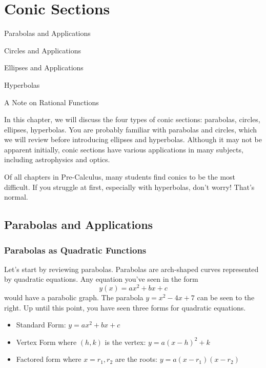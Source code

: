 \documentclass[../book.tex]{subfiles}
\begin{document}
\chapter{Conic Sections}
\begin{introduction}[Contents]
\item Parabolas and Applications
\item Circles and Applications
\item Ellipses and Applications
\item Hyperbolas
\item A Note on Rational Functions
\end{introduction}

\noindent In this chapter, we will discuss the four types of conic sections: parabolas, circles, ellipses, hyperbolas.  You are probably familiar with parabolas and circles, which we will review before introducing ellipses and hyperbolas.  Although it may not be apparent initially, conic sections have various applications in many subjects, including astrophysics and optics.  

\begin{remark} 
Of all chapters in Pre-Calculus, many students find conics to be the most difficult.  If you struggle at first, especially with hyperbolas, don't worry!  That's normal.
\end{remark}

\section{Parabolas and Applications}
\subsection{Parabolas as Quadratic Functions}
\noindent Let's start by reviewing parabolas.  Parabolas are arch-shaped curves represented by quadratic equations.  Any equation you've seen in the form $$y(x) = ax^2+bx+c$$
would have a parabolic graph.  The parabola $y=x^2-4x+7$ can be seen to the right.  Up until this point, you have seen three forms for quadratic equations.

\begin{itemize}
    \item Standard Form: $y = ax^2+bx+c$
    \item Vertex Form where $(h,k)$ is the vertex: $y = a(x-h)^2+k $
    \item Factored form where $x=r_1,r_2$ are the roots: $y = a(x-r_1)(x-r_2) $
\end{itemize}
\end{document}
